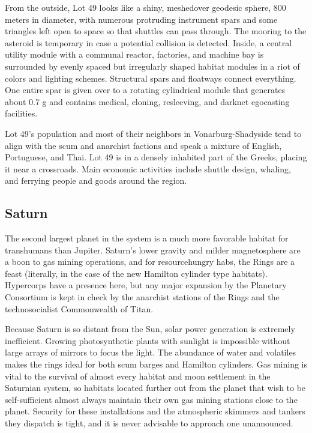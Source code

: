 From the outside, Lot 49 looks like a shiny, meshedover geodesic
sphere, 800 meters in diameter, with numerous protruding instrument
spars and some triangles left open to space so that shuttles can pass
through. The mooring to the asteroid is temporary in case a potential
collision is detected. Inside, a central utility module with a
communal reactor, factories, and machine bay is surrounded by evenly
spaced but irregularly shaped habitat modules in a riot of colors and
lighting schemes. Structural spars and floatways connect
everything. One entire spar is given over to a rotating cylindrical
module that generates about 0.7 g and contains medical, cloning,
resleeving, and darknet egocasting facilities.

Lot 49's population and most of their neighbors in Vonarburg-Shadyside
tend to align with the scum and anarchist factions and speak a mixture
of English, Portuguese, and Thai. Lot 49 is in a densely inhabited
part of the Greeks, placing it near a crossroads. Main economic
activities include shuttle design, whaling, and ferrying people and
goods around the region.

\subsection{Saturn}
\label{sec:saturn}

The second largest planet in the system is a much more favorable
habitat for transhumans than Jupiter.  Saturn's lower gravity and
milder magnetosphere are a boon to gas mining operations, and for
resourcehungry habs, the Rings are a feast (literally, in the case of
the new Hamilton cylinder type habitats). Hypercorps have a presence
here, but any major expansion by the Planetary Consortium is kept in
check by the anarchist stations of the Rings and the technosocialist
Commonwealth of Titan.

Because Saturn is so distant from the Sun, solar power generation is
extremely inefficient. Growing photosynthetic plants with sunlight is
impossible without large arrays of mirrors to focus the light. The
abundance of water and volatiles makes the rings ideal for both scum
barges and Hamilton cylinders.  Gas mining is vital to the survival of
almost every habitat and moon settlement in the Saturnian system, so
habitats located further out from the planet that wish to be
self-sufficient almost always maintain their own gas mining stations
close to the planet. Security for these installations and the
atmospheric skimmers and tankers they dispatch is tight, and it is
never advisable to approach one unannounced.

